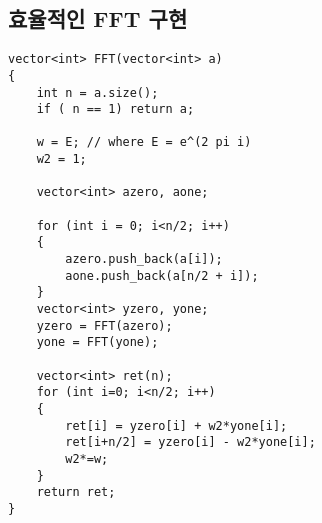 \documentclass{article}
\begin{document}
\subsection{효율적인 FFT 구현}

\begin{lstlisting}
vector<int> FFT(vector<int> a)
{
    int n = a.size();
    if ( n == 1) return a;

    w = E; // where E = e^(2 pi i)
    w2 = 1;

    vector<int> azero, aone;

    for (int i = 0; i<n/2; i++)
    {
        azero.push_back(a[i]);
        aone.push_back(a[n/2 + i]);
    }
    vector<int> yzero, yone;
    yzero = FFT(azero);
    yone = FFT(yone);

    vector<int> ret(n);
    for (int i=0; i<n/2; i++)
    {
        ret[i] = yzero[i] + w2*yone[i];
        ret[i+n/2] = yzero[i] - w2*yone[i];
        w2*=w;
    }
    return ret;
}
\end{lstlisting}
\end{document}
